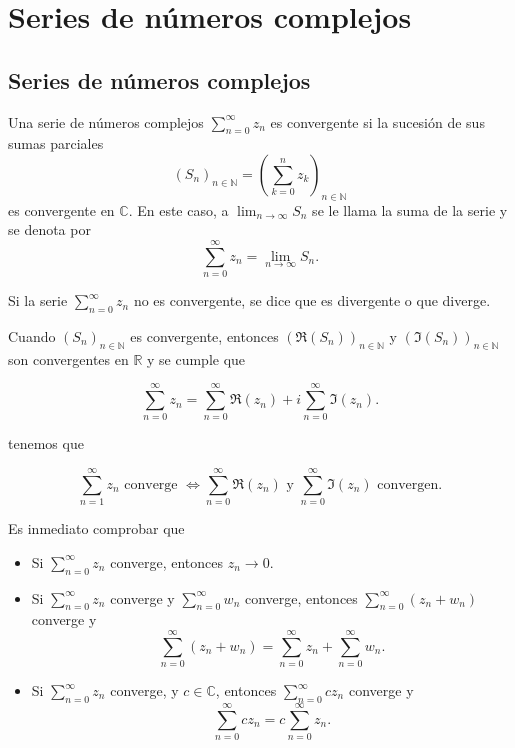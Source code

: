 \section{Series de números complejos}
\subsection{Series de números complejos}

\begin{definición} 
    Una serie de números complejos $\sum_{n=0}^{\infty} z_n$ es convergente si la sucesión de sus sumas parciales 
    \[
        (S_n)_{n\in\mathbb{N}} = \left(\sum_{k=0}^{n} z_k\right)_{n\in\mathbb{N}}
    \]
    es convergente en $\mathbb{C}$. En este caso, a $\lim_{n\to\infty} S_n$ se le llama la suma de la serie y se denota por
    \[
        \sum_{n=0}^{\infty} z_n = \lim_{n\to\infty} S_n.
    \]    
\end{definición}

Si la serie $\sum_{n=0}^{\infty} z_n$ no es convergente, se dice que es divergente o que diverge.

Cuando $(S_n)_{n\in\mathbb{N}}$ es convergente, entonces $(\Re(S_n))_{n\in\mathbb{N}}$ y $(\Im(S_n))_{n\in\mathbb{N}}$ son convergentes en $\mathbb{R}$ y se cumple que

\[
    \sum_{n=0}^{\infty} z_n = \sum_{n=0}^{\infty} \Re(z_n) + i \sum_{n=0}^{\infty} \Im(z_n).
\]

tenemos que 

\[
    \sum_{n=1}^{\infty} z_n \text{ converge } \iff \sum_{n=0}^{\infty} \Re(z_n) \text{ y } \sum_{n=0}^{\infty} \Im(z_n) \text{ convergen.}
\]

Es inmediato comprobar que 
\begin{proposición}
    \vspace{-2em}
    \begin{itemize}
        \item Si $\sum_{n=0}^{\infty} z_n$ converge, entonces $z_n \to 0$.
        \item Si $\sum_{n=0}^{\infty} z_n$ converge y $\sum_{n=0}^{\infty} w_n$ converge, entonces $\sum_{n=0}^{\infty} (z_n + w_n)$ converge y
        \[
            \sum_{n=0}^{\infty} (z_n + w_n) = \sum_{n=0}^{\infty} z_n + \sum_{n=0}^{\infty} w_n.
        \]
        \item Si $\sum_{n=0}^{\infty} z_n$ converge, y $c \in \mathbb{C}$, entonces $\sum_{n=0}^{\infty} c z_n$ converge y
        \[
            \sum_{n=0}^{\infty} c z_n = c \sum_{n=0}^{\infty} z_n.
        \]
    \end{itemize}    
\end{proposición}

